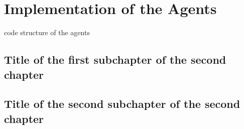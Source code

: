 \chapter{Implementation of the Agents}
code structure of the agents
\section{Title of the first subchapter of the second chapter}

\section{Title of the second subchapter of the second chapter}
